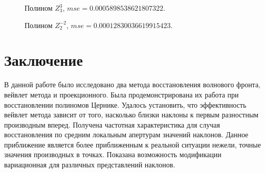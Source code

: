 \documentclass{article}
\begin{document}
\begin{figure}[H]
\caption{Полином $Z_3^{3}$, $mse =0.0005898538621807322$.}
\end{figure}

\begin{figure}[H]
\caption{Полином $Z_2^{-2}$, $mse =0.00012830036619915423$.}
\end{figure}
\newpage
\section*{Заключение}
В данной работе было исследовано два метода восстановления волнового фронта, вейвлет метода и проекционного. Была продемонстрирована их работа при восстановлении полиномов Цернике. Удалось установить, что эффективность вейвлет метода зависит от того, насколько близки наклоны к первым разностным производным вперед. Получена частотная характеристика для случая восстановления по средним локальным апертурам значений наклонов. Данное приближение является более приближенным к реальной ситуации нежели, точные значения производных в точках. Показана возможность модификации вариационная для различных представлений наклонов.


\newpage

\end{document}
